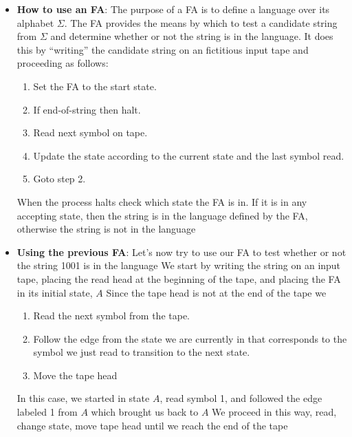 \documentclass{report}
\begin{document}
\begin{itemize}
\begin{itemize}
            \end{itemize}
        \item \textbf{How to use an FA}: The purpose of a FA is to define a language over its alphabet $\Sigma$. The FA provides the means by which to test a candidate string from $\Sigma$ and determine whether or not the string is in the language. It does this by “writing” the candidate string on an fictitious input tape and proceeding as follows:
        \begin{enumerate}
            \item Set the FA to the start state.
            \item If end-of-string then halt.
            \item Read next symbol on tape.
            \item Update the state according to the current state and the last symbol read.
            \item Goto step 2.
        \end{enumerate}
        When the process halts check which state the FA is in. If it is in any accepting state, then the string is in the language defined by the FA, otherwise the string is not in the language
    \item \textbf{Using the previous FA}: Let’s now try to use our FA to test whether or not the string 1001 is in the language
        \bigbreak \noindent 
        We start by writing the string on an input tape, placing the read head at the beginning of the tape, and placing the FA in its initial state, $A$
        \bigbreak \noindent 
        \bigbreak \noindent 
        Since the tape head is not at the end of the tape we
        \begin{enumerate}
            \item Read the next symbol from the tape.
            \item Follow the edge from the state we are currently in that corresponds to the symbol we just read to transition to the next state.
            \item Move the tape head
        \end{enumerate}
        \bigbreak \noindent 
        \bigbreak \noindent 
        In this case, we started in state $A$, read symbol 1, and followed the edge labeled 1 from $A$ which brought us back to $A$
        \bigbreak \noindent 
        We proceed in this way, read, change state, move tape head until we reach the end of the tape
        \bigbreak \noindent 

\end{itemize}
\end{document}
